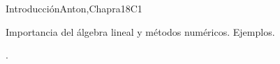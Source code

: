 \begin{syllabus}
\begin{competences}
    \item {} 
    \item {} 
    \item {} 
\end{competences}

\begin{unit}{Introducción}{}{Anton,Chapra}{18}{C1}
  \begin{topics}
      \item Importancia del álgebra lineal y métodos numéricos. Ejemplos. %
   \end{topics}

   \begin{learningoutcomes}
      \item . %
   \end{learningoutcomes}
\end{unit}

\begin{unit}{Álgebra lineal}{}Anton,Chapra}{14}{C1}
   \begin{topics}
    \item . %
    \item . %
	  \begin{subtopics}
	  \item . %
	  \item . %
	  \end{subtopics}
    \item . %
	  \begin{subtopics}
	  \item . %
	  \item . %
	  \end{subtopics}
    \item . %
    \item . %
    \end{topics}


\end{unit}
\end{syllabus}
